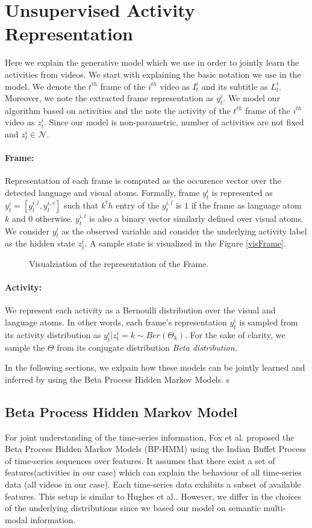 \section{Unsupervised Activity Representation}
\label{basics}
Here we explain the generative model which we use in order to jointly learn the activities from videos. We start with explaining the basic notation we use in the model. We denote the $t^{th}$ frame of the $i^{th}$ video as $I^i_t$ and its subtitle as $L^i_t$. Moreover, we note the extracted frame representation as $y^i_t$. We model our algorithm based on activities and the note the activity of the $t^{th}$ frame of the $i^{th}$ video as $z^i_t$. Since our model is non-parametric, number of activities are not fixed and $z^i_t \in \mathcal{N}$.

\paragraph{Frame:} Representation of each frame is computed as the occurence vector over the detected language and visual atoms. Formally, frame $y^i_t$ is represented as $y^i_t=[y^{i,l}_t,y^{i,v}_t]$ such that $k^th$ entry of the $y^{i,l}_t$ is $1$ if the frame as language atom $k$ and $0$ otherwise. $y^{i,l}_t$ is also a binary vector similarly defined over visual atoms. We consider $y^i_t$ as the observed variable and consider the underlying activity label as the hidden state $z^i_t$. A sample state is visualized in the Figure \ref{visFrame}.

\begin{figure}
  \caption{Visualziation of the representation of the Frame.}
\end{figure}

\paragraph{Activity:} We represent each activity as a Bernoulli distribution over the visual and language atoms. In other words, each frame's representation $y^i_t$ is sampled from its activity distribution as $y^i_t|z^i_t=k \sim Ber(\Theta_k)$. For the sake of clarity, we sample the $\Theta$ from its conjugate distribution \emph{Beta distribution}.

In the following sections, we exlpain how these models can be jointly learned and inferred by using the Beta Process Hidden Markov Models.
s
\subsection{Beta Process Hidden Markov Model}
For joint understanding of the time-series information, Fox et al.\cite{foxBPHMM} proposed the Beta Process Hidden Markov Models (BP-HMM) using the Indian Buffet Process\cite{ibp} of time-series sequences over features. It assumes that there exist a set of features(activities in our case) which can explain the behaviour of all time-series data (all videos in our case). Each time-series data exhibits a subset of available features. This setup is similar to Hughes et al.\cite{npActivity}. However, we differ in the choices of the underlying distributions since we based our model on semantic multi-modal information.

